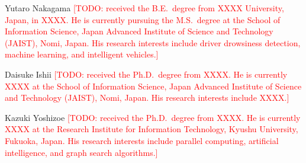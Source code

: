 \documentclass[lettersize,journal]{IEEEtran}
\newcommand{\todo}[1]{\textcolor{red}{[TODO: #1]}}
\begin{document}



\vspace{11pt}

\begin{IEEEbiographynophoto}{Yutaro Nakagama}
\todo{received the B.E.\ degree from XXXX University, Japan, in XXXX. He is currently pursuing the M.S.\ degree at the School of Information Science, Japan Advanced Institute of Science and Technology (JAIST), Nomi, Japan. His research interests include driver drowsiness detection, machine learning, and intelligent vehicles.}
\end{IEEEbiographynophoto}

\begin{IEEEbiographynophoto}{Daisuke Ishii}
\todo{received the Ph.D.\ degree from XXXX. He is currently XXXX at the School of Information Science, Japan Advanced Institute of Science and Technology (JAIST), Nomi, Japan. His research interests include XXXX.}
\end{IEEEbiographynophoto}

\begin{IEEEbiographynophoto}{Kazuki Yoshizoe}
\todo{received the Ph.D.\ degree from XXXX. He is currently XXXX at the Research Institute for Information Technology, Kyushu University, Fukuoka, Japan. His research interests include parallel computing, artificial intelligence, and graph search algorithms.}
\end{IEEEbiographynophoto}

\vfill
\end{document}
